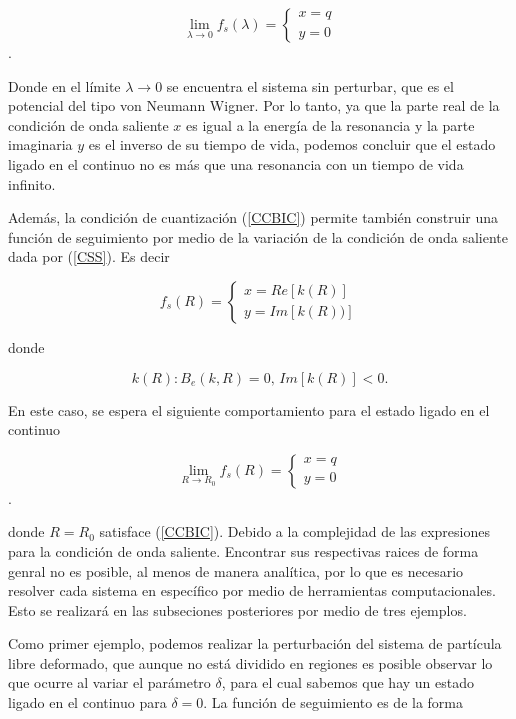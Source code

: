\begin{equation*}
\lim_{\lambda \to 0} f_s(\lambda) = 
\begin{cases}
x = q
\\
y = 0
\end{cases}
\end{equation*}.

Donde en el límite $\lambda \to 0$ se encuentra el sistema sin perturbar, que es el potencial del tipo von Neumann Wigner. Por lo tanto, ya que la parte real de la condición de onda saliente $x$ es igual a la energía de la resonancia y la parte imaginaria $y$ es el inverso de su tiempo de vida, podemos concluir que el estado ligado en el continuo no es más que una resonancia con un tiempo de vida infinito.

Además, la condición de cuantización (\ref{CCBIC}) permite también construir una función de seguimiento por medio de la variación de la condición de onda saliente dada por (\ref{CSS}). Es decir

\begin{equation*}
f_s(R) =
\begin{cases}
x = Re[k(R)]
\\
y = Im[k(R))]
\end{cases}
\end{equation*}

donde

\begin{equation*}
k(R): B_e(k,R) = 0, \, Im[k(R)] < 0.
\end{equation*}

En este caso, se espera el siguiente comportamiento para el estado ligado en el continuo

\begin{equation*}
\lim_{R \to R_0} f_s(R) = 
\begin{cases}
x = q
\\
y = 0
\end{cases}
\end{equation*}.

donde $ R = R_0$ satisface (\ref{CCBIC}). Debido a la complejidad de las expresiones para la condición de onda saliente. Encontrar sus respectivas raices de forma genral no es posible, al menos de manera analítica, por lo que es necesario resolver cada sistema en específico por medio de herramientas computacionales. Esto se realizará en las subseciones posteriores por medio de tres ejemplos. 

Como primer ejemplo, podemos realizar la perturbación del sistema de partícula libre deformado, que aunque no está dividido en regiones es posible observar lo que ocurre al variar el parámetro $\delta$, para el cual sabemos que hay un estado ligado en el continuo para $\delta = 0$. La función de seguimiento es de la forma

